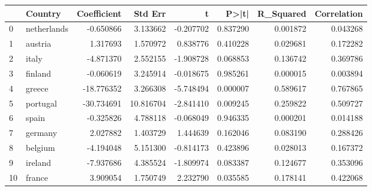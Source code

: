 \begin{tabular}{llrrrrrr}
\toprule
 & Country & Coefficient & Std Err & t & P>|t| & R_Squared & Correlation \\
\midrule
0 & netherlands & -0.650866 & 3.133662 & -0.207702 & 0.837290 & 0.001872 & 0.043268 \\
1 & austria & 1.317693 & 1.570972 & 0.838776 & 0.410228 & 0.029681 & 0.172282 \\
2 & italy & -4.871370 & 2.552155 & -1.908728 & 0.068853 & 0.136742 & 0.369786 \\
3 & finland & -0.060619 & 3.245914 & -0.018675 & 0.985261 & 0.000015 & 0.003894 \\
4 & greece & -18.776352 & 3.266308 & -5.748494 & 0.000007 & 0.589617 & 0.767865 \\
5 & portugal & -30.734691 & 10.816704 & -2.841410 & 0.009245 & 0.259822 & 0.509727 \\
6 & spain & -0.325826 & 4.788118 & -0.068049 & 0.946335 & 0.000201 & 0.014188 \\
7 & germany & 2.027882 & 1.403729 & 1.444639 & 0.162046 & 0.083190 & 0.288426 \\
8 & belgium & -4.194048 & 5.151300 & -0.814173 & 0.423896 & 0.028013 & 0.167372 \\
9 & ireland & -7.937686 & 4.385524 & -1.809974 & 0.083387 & 0.124677 & 0.353096 \\
10 & france & 3.909054 & 1.750749 & 2.232790 & 0.035585 & 0.178141 & 0.422068 \\
\bottomrule
\end{tabular}
